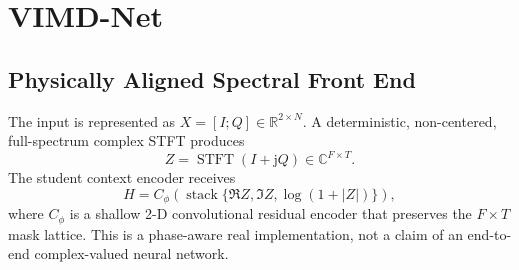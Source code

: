 \documentclass[letterpaper,journal]{IEEEtran}
\newcommand{\R}{\mathbb{R}}
\newcommand{\C}{\mathbb{C}}
\newcommand{\STFT}{\operatorname{STFT}}
\newcommand{\method}{VIMD-Net}
\begin{document}
\section{\method}
\subsection{Physically Aligned Spectral Front End}
The input is represented as $X=[I;Q]\in\R^{2\times N}$.  A deterministic,
non-centered, full-spectrum complex STFT produces
\begin{equation}
Z=\STFT(I+\mathrm{j}Q)\in\C^{F\times T}.
\end{equation}
The student context encoder receives
\begin{equation}
H=C_\phi\!\left(
\operatorname{stack}\{\Re Z,\Im Z,\log(1+|Z|)\}
\right),
\label{eq:context}
\end{equation}
where $C_\phi$ is a shallow 2-D convolutional residual encoder that preserves
the $F\times T$ mask lattice.  This is a phase-aware real implementation, not
a claim of an end-to-end complex-valued neural network.
\end{document}

